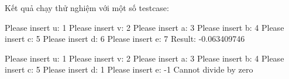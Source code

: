 Kết quả chạy thử nghiệm với một số testcase:

\begin{codeblock}[language={}]
Please insert u: 1
Please insert v: 2
Please insert a: 3
Please insert b: 4
Please insert c: 5
Please insert d: 6
Please insert e: 7
Result: -0.063409746
\end{codeblock}

\begin{codeblock}[language={}]
Please insert u: 1
Please insert v: 2
Please insert a: 3
Please insert b: 4
Please insert c: 5
Please insert d: 1
Please insert e: -1
Cannot divide by zero
\end{codeblock}
